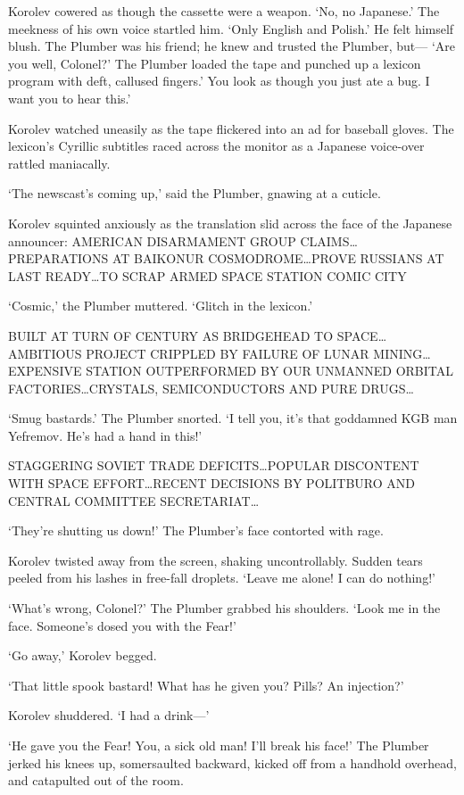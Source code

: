 Korolev cowered as though the cassette were a weapon. ‘No, no Japanese.’ The meekness of his own voice startled him. ‘Only English and Polish.’ He felt himself blush. The Plumber was his friend; he knew and trusted the Plumber, but— ‘Are you well, Colonel?’ The Plumber loaded the tape and punched up a lexicon program with deft, callused fingers.’ You look as though you just ate a bug. I want you to hear this.’

Korolev watched uneasily as the tape flickered into an ad for baseball gloves. The lexicon’s Cyrillic subtitles raced across the monitor as a Japanese voice-over rattled maniacally.

‘The newscast’s coming up,’ said the Plumber, gnawing at a cuticle.

Korolev squinted anxiously as the translation slid across the face of the Japanese announcer: AMERICAN DISARMAMENT GROUP CLAIMS…PREPARATIONS AT BAIKONUR COSMODROME…PROVE RUSSIANS AT LAST READY…TO SCRAP ARMED SPACE STATION COMIC CITY

‘Cosmic,’ the Plumber muttered. ‘Glitch in the lexicon.’

BUILT AT TURN OF CENTURY AS BRIDGEHEAD TO SPACE…AMBITIOUS PROJECT CRIPPLED BY FAILURE OF LUNAR MINING…EXPENSIVE STATION OUTPERFORMED BY OUR UNMANNED ORBITAL FACTORIES…CRYSTALS, SEMICONDUCTORS AND PURE DRUGS…

‘Smug bastards.’ The Plumber snorted. ‘I tell you, it’s that goddamned KGB man Yefremov. He’s had a hand in this!’

STAGGERING SOVIET TRADE DEFICITS…POPULAR DISCONTENT WITH SPACE EFFORT…RECENT DECISIONS BY POLITBURO AND CENTRAL COMMITTEE SECRETARIAT…

‘They’re shutting us down!’ The Plumber’s face contorted with rage.

Korolev twisted away from the screen, shaking uncontrollably. Sudden tears peeled from his lashes in free-fall droplets. ‘Leave me alone! I can do nothing!’

‘What’s wrong, Colonel?’ The Plumber grabbed his shoulders. ‘Look me in the face. Someone’s dosed you with the Fear!’

‘Go away,’ Korolev begged.

‘That little spook bastard! What has he given you? Pills? An injection?’

Korolev shuddered. ‘I had a drink—’

‘He gave you the Fear! You, a sick old man! I’ll break his face!’ The Plumber jerked his knees up, somersaulted backward, kicked off from a handhold overhead, and catapulted out of the room.

